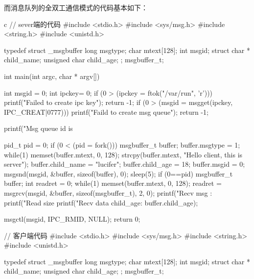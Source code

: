而消息队列的全双工通信模式的代码基本如下：
\begin{code-block}{c}
// sever端的代码
#include <stdio.h>
#include <sys/msg.h>
#include <string.h>
#include <unistd.h>

typedef struct _msgbuffer{
        long msgtype;
        char mtext[128];
        int msgid;
        struct {
            char * child_name;
            unsigned char child_age;
        };
}msgbuffer_t;

int main(int argc, char * argv[])
{
        int msgid = 0;
        int ipckey= 0;
        if (0 > (ipckey = ftok("/var/run", 'r')))
        {
                printf("Failed to create ipc key\n");
                return -1;
        }
        if (0 > (msgid = msgget(ipckey, IPC_CREAT|0777)))
        {
                printf("Faild to create msg queue\n");
                return -1;
        }

        printf("Msg queue id is %

        pid_t pid = 0;
        if (0 < (pid = fork()))
        {
                msgbuffer_t buffer;
                buffer.msgtype = 1;
                while(1)
                {
                        memset(buffer.mtext, 0, 128);
                        strcpy(buffer.mtext,
                                "Hello client, this is server");
                        buffer.child_name = "lucifer";
                        buffer.child_age = 18;
                        buffer.msgid = 0;
                        msgsnd(msgid, &buffer, sizeof(buffer), 0);
                        sleep(5);
                }
        }
        if (0==pid)
        {
                msgbuffer_t buffer;
                int readret = 0;
                while(1)
                {
                        memset(buffer.mtext, 0, 128);
                        readret = msgrcv(msgid,
                                &buffer, sizeof(msgbuffer_t), 2, 0);
                        printf("Recv msg :%
                        printf("Read size %
                        printf("Recv data child_age: %
                                buffer.child_age);
                }
        }


        msgctl(msgid, IPC_RMID, NULL);
        return 0;
}


// 客户端代码
#include <stdio.h>
#include <sys/msg.h>
#include <string.h>
#include <unistd.h>

typedef struct _msgbuffer{
        long msgtype;
        char mtext[128];
        int msgid;
        struct {
            char * child_name;
            unsigned char child_age;
        };
}msgbuffer_t;


\end{code-block}
